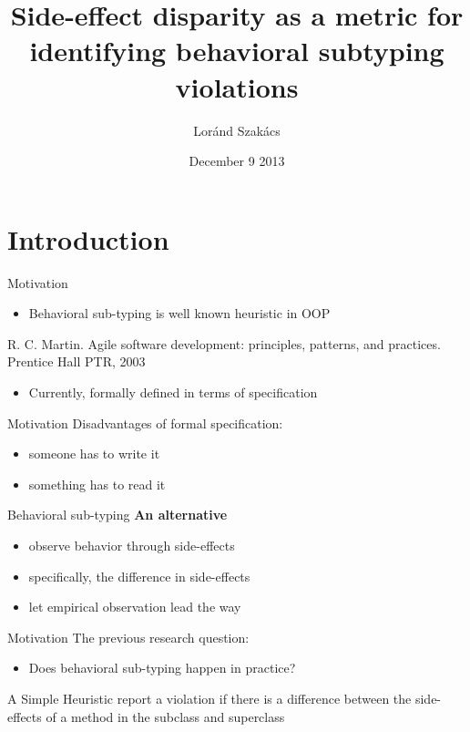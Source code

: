 \documentclass{beamer}
\title[]{Side-effect disparity as a metric for identifying behavioral subtyping violations}
\author{Lor\'{a}nd Szak\'{a}cs}
\institute{Iowa State University}
\date{December 9 2013}
\begin{document}
\begin{frame}
\titlepage
\end{frame}

\Large

\section{Introduction}
\begin{frame}{Motivation}
\huge
\begin{itemize}
  \item  Behavioral sub-typing is well known heuristic in OOP
 \end{itemize}
 \tiny
R. C. Martin. Agile software development: principles, patterns, and practices. Prentice Hall PTR, 2003
 \huge
 \begin{itemize} 
  \item \pause Currently, formally defined in terms of specification
\end{itemize}
\end{frame}

\begin{frame}{Motivation}
\huge
Disadvantages of formal specification:
\begin{itemize}
  \item \pause someone has to write it
  \item \pause something has to read it
\end{itemize}
\end{frame}

\begin{frame}{Behavioral sub-typing}
\huge
\textbf{An alternative}
\begin{itemize}
  \item \pause observe behavior through side-effects
  \item \pause specifically, the difference in side-effects
  \item \pause let empirical observation lead the way
\end{itemize}
\end{frame}

\begin{frame}{Motivation}
\Huge
The previous research question:
\huge
\begin{itemize}
  \item \pause Does behavioral sub-typing happen in practice?
\end{itemize}
\end{frame} 

\begin{frame}{A Simple Heuristic}
\Huge
report a violation if there is a difference between the side-effects of a method in the subclass and superclass
\end{frame}
\end{document}
